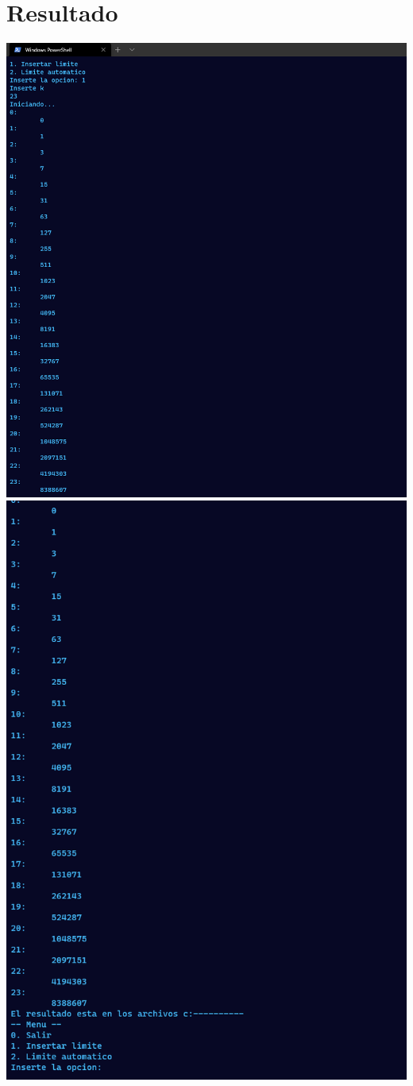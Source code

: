 \documentclass{article}
\begin{document}
	\section{Resultado}
		\centering
		\includegraphics[height=0.8\textheight]{sigma1}
		\includegraphics[height=\textheight]{sigma2}
\end{document}
